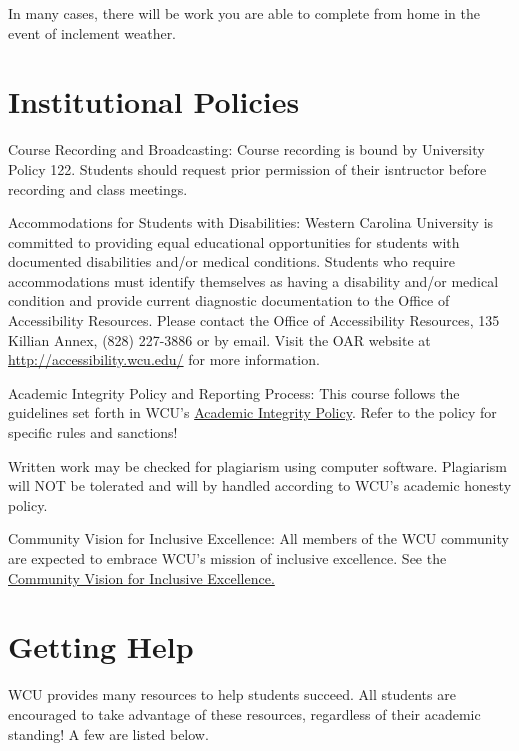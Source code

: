 \documentclass[11pt]{article}
\begin{document}
In many cases, there will be work you are able to complete from home in the event of inclement weather.


\section{Institutional Policies}
\label{sec:org5721415}

Course Recording and Broadcasting: Course recording is bound by University Policy 122. Students should request prior permission of their isntructor before recording and class meetings.

Accommodations for Students with Disabilities: Western Carolina University is committed to providing equal educational opportunities for students with documented disabilities and/or medical conditions. Students who require accommodations must identify themselves as having a disability and/or medical condition and provide current diagnostic documentation to the Office of Accessibility Resources. Please contact the Office of Accessibility Resources, 135 Killian Annex, (828) 227-3886 or by email. Visit the OAR website at \url{http://accessibility.wcu.edu/} for more information.

Academic Integrity Policy and Reporting Process: This course follows the guidelines set forth in WCU’s \href{https://www.wcu.edu/experience/dean-of-students/academic-integrity.aspx}{Academic Integrity Policy}. Refer to the policy for specific rules and sanctions!

Written work may be checked for plagiarism using computer software. Plagiarism will NOT be tolerated and will by handled according to WCU’s academic honesty policy.

Community Vision for Inclusive Excellence: All members of the WCU community are expected to embrace WCU’s mission of inclusive excellence. See the \href{https://www.wcu.edu/discover/diversity/eodp/}{Community Vision for Inclusive Excellence.}

\section{Getting Help}
\label{sec:org1d93b88}

WCU provides many resources to help students succeed. All students are encouraged to take advantage of these resources, regardless of their academic standing! A few are listed below.
\end{document}

